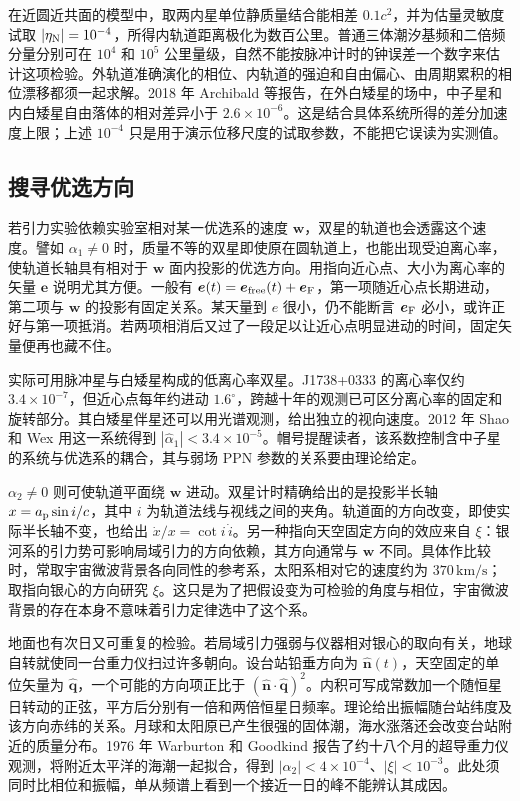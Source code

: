 在近圆近共面的模型中，取两内星单位静质量结合能相差 $0.1c^2$，并为估量灵敏度试取 $|\eta_{\rm N}|=10^{-4}$，所得内轨道距离极化为数百公里。普通三体潮汐基频和二倍频分量分别可在 $10^4$ 和 $10^5$ 公里量级，自然不能按脉冲计时的钟误差一个数字来估计这项检验。外轨道准确演化的相位、内轨道的强迫和自由偏心、由周期累积的相位漂移都须一起求解。2018 年 Archibald 等报告，在外白矮星的场中，中子星和内白矮星自由落体的相对差异小于 $2.6\times10^{-6}$。这是结合具体系统所得的差分加速度上限；上述 $10^{-4}$ 只是用于演示位移尺度的试取参数，不能把它误读为实测值。

\subsection{搜寻优选方向}

若引力实验依赖实验室相对某一优选系的速度 $\bm w$，双星的轨道也会透露这个速度。譬如 $\alpha_1\ne0$ 时，质量不等的双星即使原在圆轨道上，也能出现受迫离心率，使轨道长轴具有相对于 $\bm w$ 面内投影的优选方向。用指向近心点、大小为离心率的矢量 $\bm e$ 说明尤其方便。一般有 $\bm e(t)=\bm e_{\rm free}(t)+\bm e_{\rm F}$，第一项随近心点长期进动，第二项与 $\bm w$ 的投影有固定关系。某天量到 $e$ 很小，仍不能断言 $\bm e_{\rm F}$ 必小，或许正好与第一项抵消。若两项相消后又过了一段足以让近心点明显进动的时间，固定矢量便再也藏不住。

实际可用脉冲星与白矮星构成的低离心率双星。J1738+0333 的离心率仅约 $3.4\times10^{-7}$，但近心点每年约进动 $1.6^\circ$，跨越十年的观测已可区分离心率的固定和旋转部分。其白矮星伴星还可以用光谱观测，给出独立的视向速度。2012 年 Shao 和 Wex 用这一系统得到 $|\hat\alpha_1|<3.4\times10^{-5}$。帽号提醒读者，该系数控制含中子星的系统与优选系的耦合，其与弱场 PPN 参数的关系要由理论给定。

$\alpha_2\ne0$ 则可使轨道平面绕 $\bm w$ 进动。双星计时精确给出的是投影半长轴 $x=a_{\rm p}\sin i/c$，其中 $i$ 为轨道法线与视线之间的夹角。轨道面的方向改变，即使实际半长轴不变，也给出 $\dot x/x=\cot i\,\dot i$。另一种指向天空固定方向的效应来自 $\xi$：银河系的引力势可影响局域引力的方向依赖，其方向通常与 $\bm w$ 不同。具体作比较时，常取宇宙微波背景各向同性的参考系，太阳系相对它的速度约为 $370\,\mathrm{km/s}$；取指向银心的方向研究 $\xi$。这只是为了把假设变为可检验的角度与相位，宇宙微波背景的存在本身不意味着引力定律选中了这个系。

地面也有次日又可重复的检验。若局域引力强弱与仪器相对银心的取向有关，地球自转就使同一台重力仪扫过许多朝向。设台站铅垂方向为 $\hat{\bm n}(t)$，天空固定的单位矢量为 $\hat{\bm q}$，一个可能的方向项正比于 $(\hat{\bm n}\cdot\hat{\bm q})^2$。内积可写成常数加一个随恒星日转动的正弦，平方后分别有一倍和两倍恒星日频率。理论给出振幅随台站纬度及该方向赤纬的关系。月球和太阳原已产生很强的固体潮，海水涨落还会改变台站附近的质量分布。1976 年 Warburton 和 Goodkind 报告了约十八个月的超导重力仪观测，将附近太平洋的海潮一起拟合，得到 $|\alpha_2|<4\times10^{-4}$、$|\xi|<10^{-3}$。此处须同时比相位和振幅，单从频谱上看到一个接近一日的峰不能辨认其成因。

